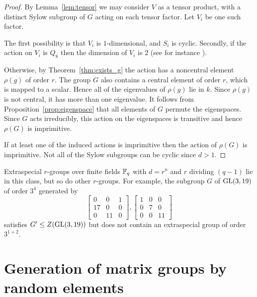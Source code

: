 \begin{proof}
By Lemma~\ref{lem:tensor} we may consider $V$ 
as a tensor product, with a distinct Sylow 
subgroup of $G$ acting on each tensor factor. 
Let $V_i$ be one such factor. 

The first possibility is that $V_i$ is $1$-dimensional, and $S_i$ is cyclic. 
Secondly, if the action on $V_i$  is $Q_8$ then the 
dimension of $V_i$ is $2$ (see for instance \cite[\S 47]{CR0}).

Otherwise, by Theorem~\ref{thm:exists_g} 
the  action has a
 noncentral element  $\rho(g)$ of order $r$.
The group $G$ also contains a central element of order $r$, which is mapped to a scalar.  
 Hence all of the eigenvalues 
of $\rho(g)$ lie in $k$. Since $\rho(g)$ is 
not central, it has more than one eigenvalue.  
It follows from Proposition~\ref{prop:eigenspace} 
that all elements of $G$ permute the eigenspaces. 
Since $G$ acts irreducibly, this action on 
the eigenspaces is transitive and hence $\rho(G)$ is imprimitive.

If at least one of the induced actions is imprimitive 
then the action of $\rho(G)$ is imprimitive. Not 
all of the Sylow subgroups can be cyclic since $d > 1$.
\end{proof}

Extraspecial $r$-groups over finite fields $\mathbb{F}_q$
with $d = r^n$ and $r$ dividing $(q-1)$ lie in this class, but so do other $r$-groups. For example, the subgroup $G$ of $\GL(3, 19)$ of order $3^4$ generated by
$$\left[ \begin{array}{ccc}
0 & 0 & 1 \\
17 & 0 & 0 \\
0 & 11 & 0 \end{array}\right], 
\left[ \begin{array}{ccc}
1 & 0 & 0 \\
0 & 7 & 0 \\
0 & 0 & 11 \end{array} \right]$$
satisfies $G' \leq Z(\GL(3, 19))$ but does not contain an 
extraspecial group of order $3^{1+2}$.


\section{Generation of matrix groups by random elements} \label{sec:generation}

